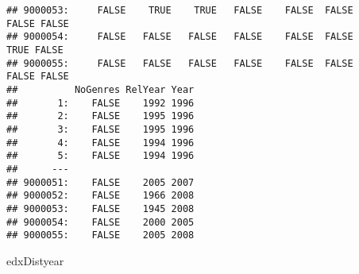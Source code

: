 \documentclass[
]{article}
\newenvironment{Shaded}{\begin{snugshade}}{\end{snugshade}}
\newcommand{\NormalTok}[1]{#1}
\begin{document}
\begin{verbatim}
## 9000053:     FALSE    TRUE    TRUE   FALSE    FALSE  FALSE       FALSE FALSE
## 9000054:     FALSE   FALSE   FALSE   FALSE    FALSE  FALSE        TRUE FALSE
## 9000055:     FALSE   FALSE   FALSE   FALSE    FALSE  FALSE       FALSE FALSE
##          NoGenres RelYear Year
##       1:    FALSE    1992 1996
##       2:    FALSE    1995 1996
##       3:    FALSE    1995 1996
##       4:    FALSE    1994 1996
##       5:    FALSE    1994 1996
##      ---                      
## 9000051:    FALSE    2005 2007
## 9000052:    FALSE    1966 2008
## 9000053:    FALSE    1945 2008
## 9000054:    FALSE    2000 2005
## 9000055:    FALSE    2005 2008
\end{verbatim}

\begin{Shaded}
\begin{Highlighting}[]
\NormalTok{edxDistyear}
\end{Highlighting}
\end{Shaded}
\end{document}
